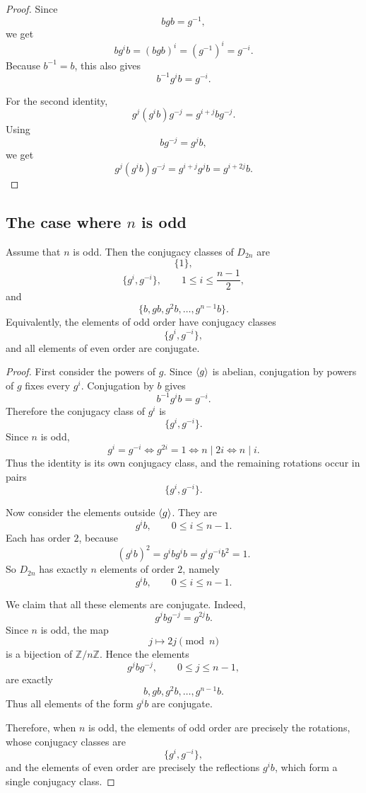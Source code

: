\begin{proof}
Since
\[
    bgb=g^{-1},
\]
we get
\[
    bg^i b=(bgb)^i=(g^{-1})^i=g^{-i}.
\]
Because $b^{-1}=b$, this also gives
\[
    b^{-1}g^i b=g^{-i}.
\]

For the second identity,
\[
    g^j(g^i b)g^{-j}
    =
    g^{i+j} b g^{-j}.
\]
Using
\[
    bg^{-j}=g^j b,
\]
we get
\[
    g^j(g^i b)g^{-j}
    =
    g^{i+j}g^j b
    =
    g^{i+2j}b.
\]
\end{proof}

\subsection{The case where \texorpdfstring{$n$}{n} is odd}

\begin{theorem}
Assume that $n$ is odd. Then the conjugacy classes of $D_{2n}$ are
\[
    \{1\},
\]
\[
    \{g^i,g^{-i}\},
    \qquad
    1\leq i\leq \frac{n-1}{2},
\]
and
\[
    \{b,gb,g^2b,\ldots,g^{n-1}b\}.
\]
Equivalently, the elements of odd order have conjugacy classes
\[
    \{g^i,g^{-i}\},
\]
and all elements of even order are conjugate.
\end{theorem}

\begin{proof}
First consider the powers of $g$. Since $\langle g\rangle$ is abelian, conjugation by powers of $g$ fixes every $g^i$. Conjugation by $b$ gives
\[
    b^{-1}g^i b
    =
    g^{-i}.
\]
Therefore the conjugacy class of $g^i$ is
\[
    \{g^i,g^{-i}\}.
\]
Since $n$ is odd,
\[
    g^i=g^{-i}
    \iff
    g^{2i}=1
    \iff
    n\mid 2i
    \iff
    n\mid i.
\]
Thus the identity is its own conjugacy class, and the remaining rotations occur in pairs
\[
    \{g^i,g^{-i}\}.
\]

Now consider the elements outside $\langle g\rangle$. They are
\[
    g^i b,
    \qquad
    0\leq i\leq n-1.
\]
Each has order $2$, because
\[
    (g^i b)^2
    =
    g^i b g^i b
    =
    g^i g^{-i}b^2
    =
    1.
\]
So $D_{2n}$ has exactly $n$ elements of order $2$, namely
\[
    g^i b,
    \qquad
    0\leq i\leq n-1.
\]

We claim that all these elements are conjugate. Indeed,
\[
    g^j b g^{-j}
    =
    g^{2j}b.
\]
Since $n$ is odd, the map
\[
    j\longmapsto 2j
    \pmod n
\]
is a bijection of $\mathbb Z/n\mathbb Z$. Hence the elements
\[
    g^j b g^{-j},
    \qquad
    0\leq j\leq n-1,
\]
are exactly
\[
    b,gb,g^2b,\ldots,g^{n-1}b.
\]
Thus all elements of the form $g^i b$ are conjugate.

Therefore, when $n$ is odd, the elements of odd order are precisely the rotations, whose conjugacy classes are
\[
    \{g^i,g^{-i}\},
\]
and the elements of even order are precisely the reflections $g^i b$, which form a single conjugacy class.
\end{proof}

